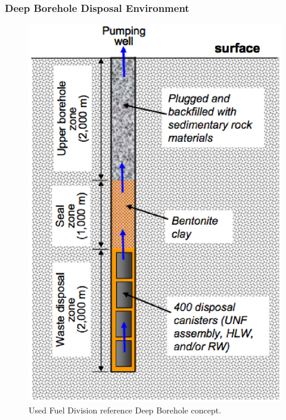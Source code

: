 \begin{frame}[ctb!]
  \frametitle{Deep Borehole Disposal Environment}

  \begin{figure}[h!]
    \begin{center}
      \includegraphics[height=.7\textheight]{boreholeGPAM.eps}
    \end{center}
    \caption{Used Fuel Division reference Deep Borehole concept.\cite{clayton_generic_2010}}
    \label{fig:boreholeGPAM}
  \end{figure}
\end{frame}


